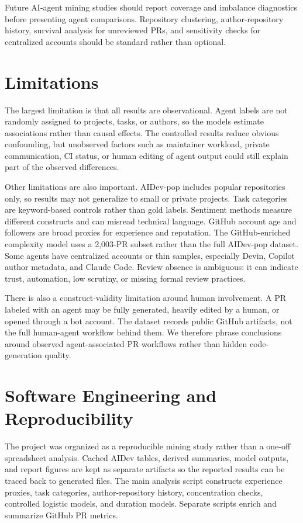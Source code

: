\documentclass[sigconf,nonacm]{acmart}
\begin{document}
Future AI-agent mining studies should report coverage and imbalance diagnostics before presenting agent comparisons. Repository clustering, author-repository history, survival analysis for unreviewed PRs, and sensitivity checks for centralized accounts should be standard rather than optional.

\FloatBarrier
\section{Limitations}

The largest limitation is that all results are observational. Agent labels are not randomly assigned to projects, tasks, or authors, so the models estimate associations rather than causal effects. The controlled results reduce obvious confounding, but unobserved factors such as maintainer workload, private communication, CI status, or human editing of agent output could still explain part of the observed differences.

Other limitations are also important. AIDev-pop includes popular repositories only, so results may not generalize to small or private projects. Task categories are keyword-based controls rather than gold labels. Sentiment methods measure different constructs and can misread technical language. GitHub account age and followers are broad proxies for experience and reputation. The GitHub-enriched complexity model uses a 2,003-PR subset rather than the full AIDev-pop dataset. Some agents have centralized accounts or thin samples, especially Devin, Copilot author metadata, and Claude Code. Review absence is ambiguous: it can indicate trust, automation, low scrutiny, or missing formal review practices.

There is also a construct-validity limitation around human involvement. A PR labeled with an agent may be fully generated, heavily edited by a human, or opened through a bot account. The dataset records public GitHub artifacts, not the full human-agent workflow behind them. We therefore phrase conclusions around observed agent-associated PR workflows rather than hidden code-generation quality.

\FloatBarrier
\section{Software Engineering and Reproducibility}

The project was organized as a reproducible mining study rather than a one-off spreadsheet analysis. Cached AIDev tables, derived summaries, model outputs, and report figures are kept as separate artifacts so the reported results can be traced back to generated files. The main analysis script constructs experience proxies, task categories, author-repository history, concentration checks, controlled logistic models, and duration models. Separate scripts enrich and summarize GitHub PR metrics.
\end{document}

